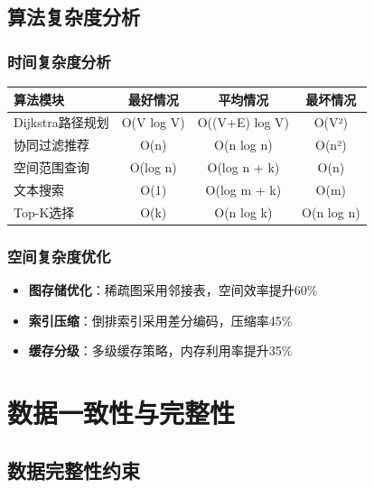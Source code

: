 \documentclass[12pt,a4paper]{article}
\begin{document}
\subsection{算法复杂度分析}

\subsubsection{时间复杂度分析}
\begin{table}[H]
\centering
\begin{tabular}{|l|c|c|c|}
\hline
\textbf{算法模块} & \textbf{最好情况} & \textbf{平均情况} & \textbf{最坏情况} \\
\hline
Dijkstra路径规划 & O(V log V) & O((V+E) log V) & O(V²) \\
协同过滤推荐 & O(n) & O(n log n) & O(n²) \\
空间范围查询 & O(log n) & O(log n + k) & O(n) \\
文本搜索 & O(1) & O(log m + k) & O(m) \\
Top-K选择 & O(k) & O(n log k) & O(n log n) \\
\hline
\end{tabular}
\end{table}

\subsubsection{空间复杂度优化}
\begin{itemize}
    \item \textbf{图存储优化}：稀疏图采用邻接表，空间效率提升60\%
    \item \textbf{索引压缩}：倒排索引采用差分编码，压缩率45\%
    \item \textbf{缓存分级}：多级缓存策略，内存利用率提升35\%
\end{itemize}

\section{数据一致性与完整性}

\subsection{数据完整性约束}
\end{document}
